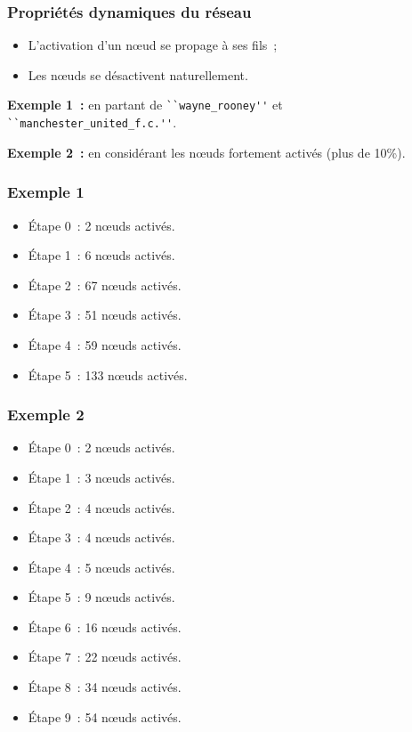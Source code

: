 \documentclass[12pt, handout]{beamer}
\begin{document}
\begin{frame}[fragile]
 \frametitle{Propriétés dynamiques du réseau}
 
 \begin{itemize}
  \item  L'activation d'un n\oe{}ud se propage à ses fils~;
  \item Les n\oe{}uds se désactivent naturellement.
 \end{itemize}
 
 \textbf{Exemple 1~:} en partant de \verb|``wayne_rooney''| et  \verb|``manchester_united_f.c.''|.
 
 \textbf{Exemple 2~:} en considérant les n\oe{}uds fortement activés (plus de 10\%).
 
 
\end{frame}


\begin{frame}
  \frametitle{Exemple 1}
  
  \begin{itemize}
 \item Étape 0~: 2  n\oe{}uds activés.
 \item Étape 1~: 6  n\oe{}uds activés.
 \item Étape 2~: 67 n\oe{}uds activés.
 \item Étape 3~: 51 n\oe{}uds activés.
 \item Étape 4~: 59 n\oe{}uds activés.
 \item Étape 5~: 133 n\oe{}uds activés.
  \end{itemize}


\end{frame}

\begin{frame}
  \frametitle{Exemple 2}
  
  \begin{itemize}
 \item Étape 0~: 2  n\oe{}uds activés.
 \item Étape 1~: 3  n\oe{}uds activés.
 \item Étape 2~: 4 n\oe{}uds activés.
 \item Étape 3~: 4 n\oe{}uds activés.
 \item Étape 4~: 5 n\oe{}uds activés.
 \item Étape 5~: 9 n\oe{}uds activés.
 \item Étape 6~: 16 n\oe{}uds activés.
 \item Étape 7~: 22 n\oe{}uds activés.
  \item Étape 8~: 34 n\oe{}uds activés.
   \item Étape 9~: 54 n\oe{}uds activés.
\end{itemize}
  

\end{frame}
\end{document}
